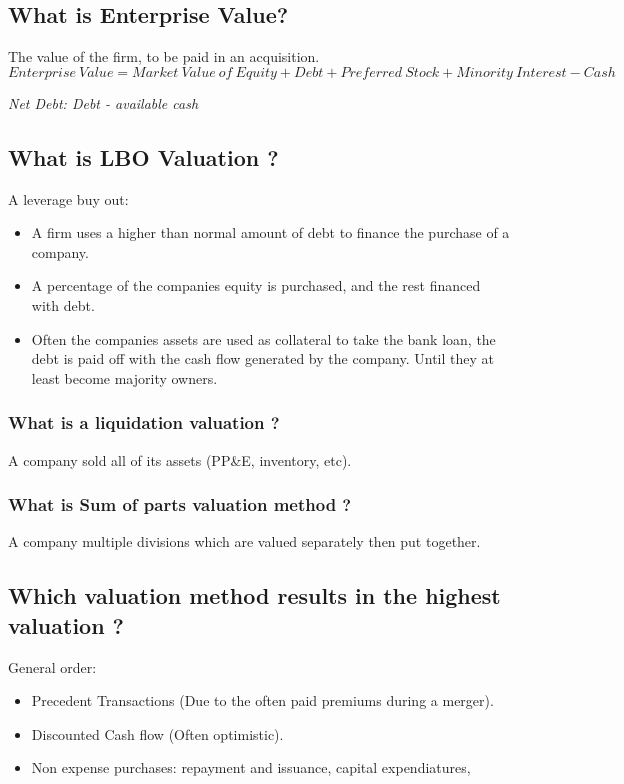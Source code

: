 \documentclass[11pt]{scrartcl} %
\begin{document}
\subsection{What is Enterprise Value?}

The value of the firm, to be paid in an acquisition.
\[ Enterprise\:Value = Market\:Value\:of\:Equity + Debt + Preferred\:Stock + Minority\:Interest - Cash \]

\textit{Net Debt: Debt - available cash}

\subsection{What is LBO Valuation ?}

A leverage buy out:

\begin{itemize}
	\item A firm uses a higher than normal amount of debt to finance the purchase of a company.
	\item A percentage of the companies equity is purchased, and the rest financed with debt.
	\item Often the companies assets are used as collateral to take the bank loan, the debt is paid off with the cash flow generated by the company. Until they at least become majority owners.
\end{itemize}
 
\subsubsection{What is a liquidation valuation ?}

A company sold all of its assets (PP\&E, inventory, etc).
  
\subsubsection{What is Sum of parts valuation method ?}

A company multiple divisions which are valued separately then put together.

\subsection{Which valuation method results in the highest valuation ?}

General order:

\begin{itemize}
	\item Precedent Transactions (Due to the often paid premiums during a merger).
	\item Discounted Cash flow (Often optimistic).
	\item Non expense purchases:  repayment and issuance, capital expendiatures, 
\end{itemize}
\end{document}
